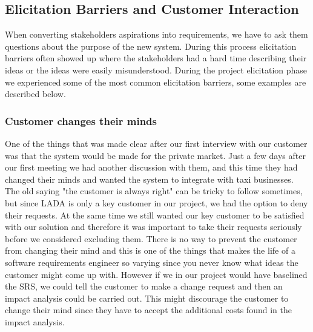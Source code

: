 \documentclass[10pt]{article}
\begin{document}
\subsection{Elicitation Barriers and Customer Interaction}
\label{barriers}
When converting stakeholders aspirations into requirements, we  have to ask them questions about the purpose of the new system. During this process elicitation barriers often showed up where the stakeholders had a hard time describing their ideas or the ideas were easily misunderstood. During the project elicitation phase we experienced some of the most common elicitation barriers, some examples are described below.

\subsubsection{Customer changes their minds}
One of the things that was made clear after our first interview with our customer was that the system would be made for the private market. Just a few days after our first meeting we had another discussion with them, and this time they had changed their minds and wanted the system to integrate with taxi businesses. The old saying "the customer is always right" can be tricky to follow sometimes, but since LADA is only a key customer in our project, we had the option to deny their requests. At the same time we still wanted our key customer to be satisfied with our solution and therefore it was important to take their requests seriously before we considered excluding them.
\newline 
\indent
There is no way to prevent the customer from changing their mind and this is one of the things that makes the life of a software requirements engineer so varying since you never know what ideas the customer might come up with. However if we in our project would have baselined the SRS, we could tell the customer to make a change request and then an impact analysis could be carried out. This might discourage the customer to change their mind since they have to accept the additional costs found in the impact analysis.
\end{document}
